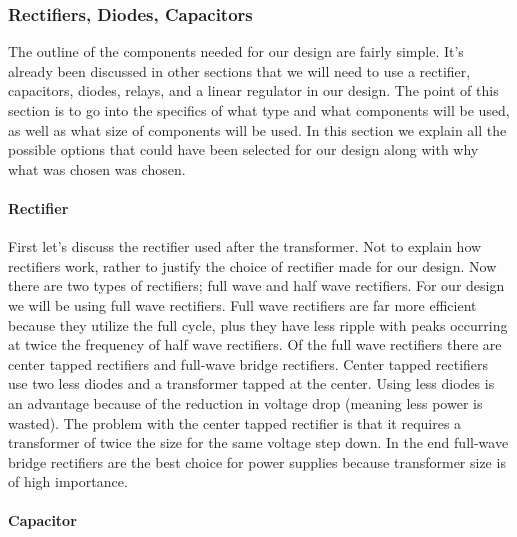 \subsubsection{Rectifiers, Diodes, Capacitors}
The outline of the components needed for our design are fairly simple. It{}'s
already been discussed in other sections that we will need to use a rectifier,
capacitors, diodes, relays, and a linear regulator in our design. The point of
this section is to go into the specifics of what type and what components will
be used, as well as what size of components will be used. In this section we
explain all the possible options that could have been selected for our design
along with why what was chosen was chosen.

\paragraph{Rectifier}

First let{}'s discuss the rectifier used after the transformer. Not to explain
how rectifiers work, rather to justify the choice of rectifier made for our
design. Now there are two types of rectifiers; full wave and half wave
rectifiers.  For our design we will be using full wave rectifiers. Full wave
rectifiers are far more efficient because they utilize the full cycle, plus
they have less ripple with peaks occurring at twice the frequency of half wave
rectifiers. Of the full wave rectifiers there are center tapped rectifiers and
full{}-wave bridge rectifiers. Center tapped rectifiers use two less diodes and
a transformer tapped at the center. Using less diodes is an advantage because
of the reduction in voltage drop (meaning less power is wasted). The problem
with the center tapped rectifier is that it requires a transformer of twice the
size for the same voltage step down. In the end full{}-wave bridge rectifiers
are the best choice for power supplies because transformer size is of high
importance.

\paragraph{Capacitor}

